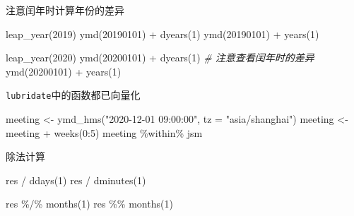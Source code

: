 \documentclass[
]{book}
\newenvironment{Shaded}{\begin{snugshade}}{\end{snugshade}}
\newcommand{\AttributeTok}[1]{\textcolor[rgb]{0.77,0.63,0.00}{#1}}
\newcommand{\CommentTok}[1]{\textcolor[rgb]{0.56,0.35,0.01}{\textit{#1}}}
\newcommand{\DecValTok}[1]{\textcolor[rgb]{0.00,0.00,0.81}{#1}}
\newcommand{\FunctionTok}[1]{\textcolor[rgb]{0.00,0.00,0.00}{#1}}
\newcommand{\NormalTok}[1]{#1}
\newcommand{\OtherTok}[1]{\textcolor[rgb]{0.56,0.35,0.01}{#1}}
\newcommand{\SpecialCharTok}[1]{\textcolor[rgb]{0.00,0.00,0.00}{#1}}
\newcommand{\StringTok}[1]{\textcolor[rgb]{0.31,0.60,0.02}{#1}}
\begin{document}
注意闰年时计算年份的差异

\begin{Shaded}
\begin{Highlighting}[]
\FunctionTok{leap\_year}\NormalTok{(}\DecValTok{2019}\NormalTok{)}
\FunctionTok{ymd}\NormalTok{(}\DecValTok{20190101}\NormalTok{) }\SpecialCharTok{+} \FunctionTok{dyears}\NormalTok{(}\DecValTok{1}\NormalTok{)}
\FunctionTok{ymd}\NormalTok{(}\DecValTok{20190101}\NormalTok{) }\SpecialCharTok{+} \FunctionTok{years}\NormalTok{(}\DecValTok{1}\NormalTok{)}

\FunctionTok{leap\_year}\NormalTok{(}\DecValTok{2020}\NormalTok{)}
\FunctionTok{ymd}\NormalTok{(}\DecValTok{20200101}\NormalTok{) }\SpecialCharTok{+} \FunctionTok{dyears}\NormalTok{(}\DecValTok{1}\NormalTok{)  }\CommentTok{\# 注意查看闰年时的差异}
\FunctionTok{ymd}\NormalTok{(}\DecValTok{20200101}\NormalTok{) }\SpecialCharTok{+} \FunctionTok{years}\NormalTok{(}\DecValTok{1}\NormalTok{)}
\end{Highlighting}
\end{Shaded}

\texttt{lubridate}中的函数都已向量化

\begin{Shaded}
\begin{Highlighting}[]
\NormalTok{meeting }\OtherTok{\textless{}{-}} \FunctionTok{ymd\_hms}\NormalTok{(}\StringTok{"2020{-}12{-}01 09:00:00"}\NormalTok{, }\AttributeTok{tz =} \StringTok{"asia/shanghai"}\NormalTok{)}
\NormalTok{meeting }\OtherTok{\textless{}{-}}\NormalTok{ meeting }\SpecialCharTok{+} \FunctionTok{weeks}\NormalTok{(}\DecValTok{0}\SpecialCharTok{:}\DecValTok{5}\NormalTok{)}
\NormalTok{meeting }\SpecialCharTok{\%within\%}\NormalTok{ jsm}
\end{Highlighting}
\end{Shaded}

除法计算

\begin{Shaded}
\begin{Highlighting}[]
\NormalTok{res }\SpecialCharTok{/} \FunctionTok{ddays}\NormalTok{(}\DecValTok{1}\NormalTok{)}
\NormalTok{res }\SpecialCharTok{/} \FunctionTok{dminutes}\NormalTok{(}\DecValTok{1}\NormalTok{)}


\NormalTok{res }\SpecialCharTok{\%/\%} \FunctionTok{months}\NormalTok{(}\DecValTok{1}\NormalTok{)}
\NormalTok{res }\SpecialCharTok{\%\%} \FunctionTok{months}\NormalTok{(}\DecValTok{1}\NormalTok{)}
\end{Highlighting}
\end{Shaded}
\end{document}
